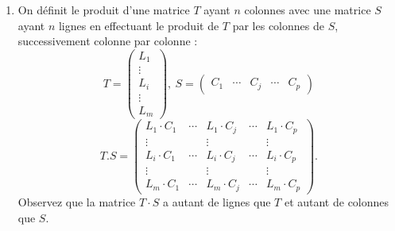 \documentclass[a4paper,12pt]{article}
\begin{document}
\begin{exercice}
\begin{enumerate}
$${\begin{array}{c}
                        \end{array}
                    \right)
               }
            $$
            Vérifier votre calcul avec {\tt sage} en entrant la matrice {\tt A} et le vecteur {\tt C} correspondant, puis en tapant {\tt A*C}.
        \item On définit le produit d'une matrice $T$ ayant $n$ colonnes avec une matrice $S$ ayant $n$ lignes en effectuant le produit
            de $T$ par les colonnes de $S$, successivement colonne par colonne :  
            $$T=\left(\begin{array}{c} L_1 \\ \vdots \\ L_i \\ \vdots \\ L_m \end{array} \right), \: 
            S=\left(\begin{array}{ccccc} C_1 & \cdots & C_j & \cdots & C_p \end{array} \right)$$
                  $$T.S = \left(
                                \begin{array}{ccccc}
                            L_1\cdot C_1 & \cdots & L_1\cdot C_j & \cdots & L_1\cdot C_p \\
                            \vdots &        & \vdots  &       & \vdots \\
                            L_i\cdot C_1 & \cdots & L_i\cdot C_j & \cdots & L_i\cdot C_p \\
                                                        \vdots &        & \vdots  &       & \vdots \\
                            L_m\cdot C_1 & \cdots & L_m\cdot C_j & \cdots & L_m\cdot C_p
                        \end{array}
                          \right).
                  $$
                  Observez que la matrice $T\cdot S$ a autant de lignes que $T$ et autant de colonnes que $S$.


\end{enumerate}
\end{exercice}
\end{document}
